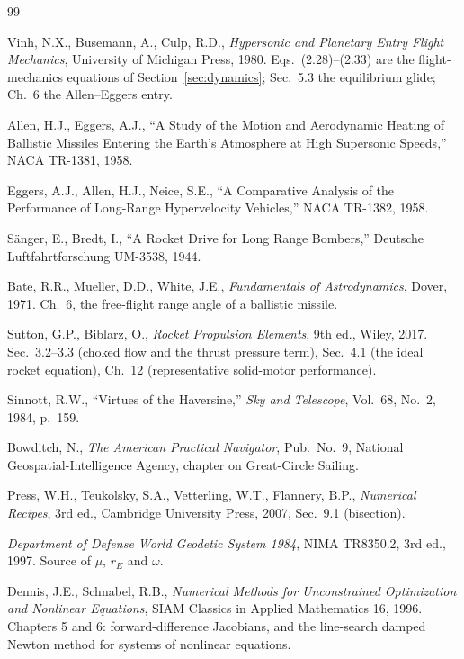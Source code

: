 \documentclass[11pt]{article}
\begin{document}
\begin{thebibliography}{99}

Vinh, N.X., Busemann, A., Culp, R.D.,
\emph{Hypersonic and Planetary Entry Flight Mechanics},
University of Michigan Press, 1980. Eqs.~(2.28)--(2.33) are the flight-mechanics
equations of Section~\ref{sec:dynamics}; Sec.~5.3 the equilibrium glide;
Ch.~6 the Allen--Eggers entry.

Allen, H.J., Eggers, A.J.,
``A Study of the Motion and Aerodynamic Heating of Ballistic Missiles Entering
the Earth's Atmosphere at High Supersonic Speeds,''
NACA TR-1381, 1958.

Eggers, A.J., Allen, H.J., Neice, S.E.,
``A Comparative Analysis of the Performance of Long-Range Hypervelocity
Vehicles,'' NACA TR-1382, 1958.

S\"anger, E., Bredt, I.,
``A Rocket Drive for Long Range Bombers,''
Deutsche Luftfahrtforschung UM-3538, 1944.

Bate, R.R., Mueller, D.D., White, J.E.,
\emph{Fundamentals of Astrodynamics}, Dover, 1971. Ch.~6, the free-flight range
angle of a ballistic missile.

Sutton, G.P., Biblarz, O.,
\emph{Rocket Propulsion Elements}, 9th ed., Wiley, 2017.
Sec.~3.2--3.3 (choked flow and the thrust pressure term), Sec.~4.1 (the ideal
rocket equation), Ch.~12 (representative solid-motor performance).

Sinnott, R.W., ``Virtues of the Haversine,''
\emph{Sky and Telescope}, Vol.~68, No.~2, 1984, p.~159.

Bowditch, N., \emph{The American Practical Navigator},
Pub.~No.~9, National Geospatial-Intelligence Agency, chapter on Great-Circle
Sailing.

Press, W.H., Teukolsky, S.A., Vetterling, W.T., Flannery, B.P.,
\emph{Numerical Recipes}, 3rd ed., Cambridge University Press, 2007, Sec.~9.1
(bisection).

\emph{Department of Defense World Geodetic System 1984},
NIMA TR8350.2, 3rd ed., 1997. Source of $\mu$, $r_E$ and $\omega$.

Dennis, J.E., Schnabel, R.B.,
\emph{Numerical Methods for Unconstrained Optimization and Nonlinear
Equations}, SIAM Classics in Applied Mathematics 16, 1996. Chapters 5 and 6:
forward-difference Jacobians, and the line-search damped Newton method for
systems of nonlinear equations.


\end{thebibliography}
\end{document}
